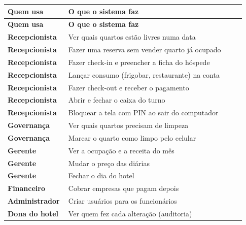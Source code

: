 \documentclass[11pt,a4paper]{article}
\newcommand{\subsecao}[1]{\Needspace{8\baselineskip}\vspace{8pt}{\large\bfseries\color{cor}#1}\par}
\begin{document}
\begin{longtable}{>{\raggedright\arraybackslash}p{0.201\linewidth}>{\raggedright\arraybackslash}p{0.727\linewidth}}
\rowcolor{cor} \color{white}\textbf{\footnotesize Quem usa} & \color{white}\textbf{\footnotesize O que o sistema faz} \\
\endfirsthead
\rowcolor{cor} \color{white}\textbf{\footnotesize Quem usa} & \color{white}\textbf{\footnotesize O que o sistema faz} \\
\endhead
\rowcolor{white}\textbf{Recepcionista} & Ver quais quartos estão livres numa data \\ \hline
\rowcolor{suave!55}\textbf{Recepcionista} & Fazer uma reserva sem vender quarto já ocupado \\ \hline
\rowcolor{white}\textbf{Recepcionista} & Fazer check-in e preencher a ficha do hóspede \\ \hline
\rowcolor{suave!55}\textbf{Recepcionista} & Lançar consumo (frigobar, restaurante) na conta \\ \hline
\rowcolor{white}\textbf{Recepcionista} & Fazer check-out e receber o pagamento \\ \hline
\rowcolor{suave!55}\textbf{Recepcionista} & Abrir e fechar o caixa do turno \\ \hline
\rowcolor{white}\textbf{Recepcionista} & Bloquear a tela com PIN ao sair do computador \\ \hline
\rowcolor{suave!55}\textbf{Governança} & Ver quais quartos precisam de limpeza \\ \hline
\rowcolor{white}\textbf{Governança} & Marcar o quarto como limpo pelo celular \\ \hline
\rowcolor{suave!55}\textbf{Gerente} & Ver a ocupação e a receita do mês \\ \hline
\rowcolor{white}\textbf{Gerente} & Mudar o preço das diárias \\ \hline
\rowcolor{suave!55}\textbf{Gerente} & Fechar o dia do hotel \\ \hline
\rowcolor{white}\textbf{Financeiro} & Cobrar empresas que pagam depois \\ \hline
\rowcolor{suave!55}\textbf{Administrador} & Criar usuários para os funcionários \\ \hline
\rowcolor{white}\textbf{Dona do hotel} & Ver quem fez cada alteração (auditoria) \\ \hline
\end{longtable}
\endgroup
\subsecao{\faBoxOpen\ Como dar prioridade}
\begingroup\small
\end{document}
